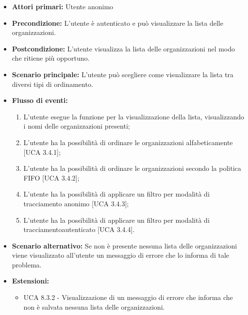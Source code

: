 \begin{itemize} 
	\item \textbf{Attori primari:} Utente anonimo
	\item \textbf{Precondizione:}  L'utente è autenticato e può visualizzare la lista delle organizzazioni.
	\item \textbf{Postcondizione:} L'utente visualizza la lista delle organizzazioni nel modo che ritiene più opportuno.
	\item \textbf{Scenario principale:}	L'utente può scegliere come visualizzare la lista tra diversi tipi di ordinamento.
	\item \textbf{Flusso di eventi:}
	\begin{enumerate}
		\item L'utente esegue la funzione per la visualizzazione della lista, visualizzando i nomi delle organizzazioni presenti;
		\item L'utente ha la possibilità di ordinare le organizzazioni alfabeticamente [UCA 3.4.1];
		\item L'utente ha la possibilità di ordinare le organizzazioni secondo la politica FIFO [UCA 3.4.2];
		\item L'utente ha la possibilità di applicare un filtro per modalità di tracciamento anonimo\ap{G} [UCA 3.4.3];
		\item L'utente ha la possibilità di applicare un filtro per modalità di tracciamentoautenticato [UCA 3.4.4].
	\end{enumerate}
	\item \textbf{Scenario alternativo:} Se non è presente nessuna lista delle organizzazioni viene visualizzato all'utente un messaggio di errore che lo informa di tale problema.
	\item \textbf{Estensioni:}
	\begin{itemize}
		\item UCA 8.3.2 - Visualizzazione di un messaggio di errore che informa che non è salvata nessuna lista delle organizzazioni.
	\end{itemize}
\end{itemize}

